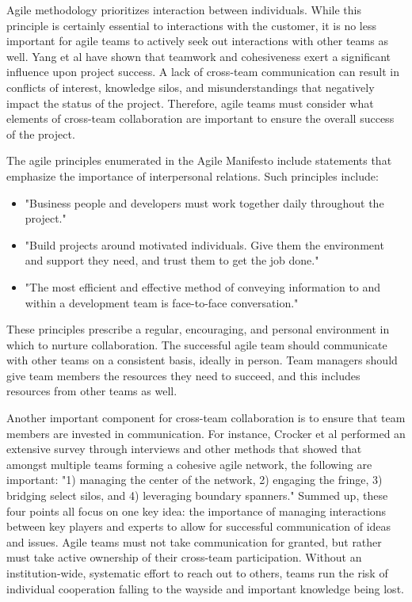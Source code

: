 
Agile methodology prioritizes interaction between individuals.
While this principle is certainly essential to interactions with the customer, it is no less important for agile teams to actively seek out interactions with other teams as well.
Yang et al\cite{YANG} have shown that teamwork and cohesiveness exert a significant influence upon project success.
A lack of cross-team communication can result in conflicts of interest, knowledge silos, and misunderstandings that negatively impact the status of the project.
Therefore, agile teams must consider what elements of cross-team collaboration are important to ensure the overall success of the project.

The agile principles enumerated in the Agile Manifesto include statements that emphasize the importance of interpersonal relations. Such principles include:
\begin{itemize}
\item "Business people and developers must work together daily throughout the project."
\item "Build projects around motivated individuals. Give them the environment and support they need, and trust them to get the job done."
\item "The most efficient and effective method of conveying information to and within a development team is face-to-face conversation." \cite{AgileMani}
\end{itemize}

These principles prescribe a regular, encouraging, and personal environment in which to nurture collaboration.
The successful agile team should communicate with other teams on a consistent basis, ideally in person.
Team managers should give team members the resources they need to succeed, and this includes resources from other teams as well.

Another important component for cross-team collaboration is to ensure that team members are invested in communication.
For instance, Crocker et al\cite{HBR} performed an extensive survey through interviews and other methods that showed that amongst multiple teams forming a cohesive agile network, the following are important: "1) managing the center of the network, 2) engaging the fringe, 3) bridging select silos, and 4) leveraging boundary spanners."
Summed up, these four points all focus on one key idea: the importance of managing interactions between key players and experts to allow for successful communication of ideas and issues.
Agile teams must not take communication for granted, but rather must take active ownership of their cross-team participation.
Without an institution-wide, systematic effort to reach out to others, teams run the risk of individual cooperation falling to the wayside and important knowledge being lost.

